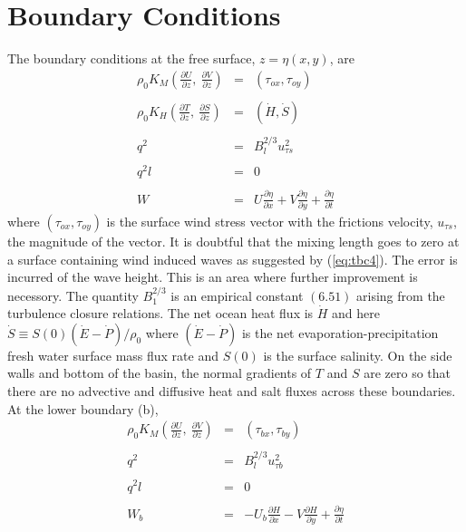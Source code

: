\documentclass[oribibl]{llncs}
\begin{document}
\section{Boundary Conditions}

The boundary conditions at the free surface, $z=\eta(x,y)$, are
\begin{eqnarray}
\rho_0 K_M \left( \frac{\partial U}{\partial z},\  \frac{\partial V}{\partial z} \right) &=& (\tau_{ox}, \tau_{oy})  \label{eq:tbc1}\\ \nonumber \\ 
\rho_0 K_H \left( \frac{\partial T}{\partial z},\  \frac{\partial S}{\partial z} \right) &=& (\dot{H}, \dot{S}) \label{eq:tbc2}\\ \nonumber \\ 
q^2 &=& B_l^{2/3} u_{\tau s}^2 \label{eq:tbc3}\\ \nonumber \\ 
q^2 l &=& 0  \label{eq:tbc4} \\ \nonumber \\ 
W   &=& U \frac{\partial \eta}{\partial x} + V \frac{\partial \eta}{\partial y} + \frac{\partial \eta}{\partial t} \label{eq:tbc5}
\end{eqnarray}
where $(\tau_{ox}, \tau_{oy})$ is the surface wind stress vector with the frictions velocity, $u_{\tau s}$, the magnitude of the vector. It is doubtful that the mixing length goes to zero at a surface containing wind induced waves as suggested by  (\ref{eq:tbc4}). The error is incurred of the wave height. This is an area where further improvement is necessory. The quantity $B_1^{2/3}$ is an empirical constant $(6.51)$ arising from the turbulence closure relations. The net ocean heat flux is $\dot{H}$ and here $\dot{S} \equiv S(0)(\dot{E}-\dot{P})/\rho_0$ where $(\dot{E}-\dot{P})$ is the net evaporation-precipitation fresh water surface mass flux rate and $S(0)$ is the surface salinity. On the side walls and bottom of the basin, the normal gradients of $T$ and $S$ are zero so that there are no advective and diffusive heat and salt fluxes across these boundaries. At the lower boundary (b),
\begin{eqnarray}
\rho_0 K_M \left( \frac{\partial U}{\partial z},\  \frac{\partial V}{\partial z} \right) &=& (\tau_{bx}, \tau_{by})  \label{eq:bbc1}\\ \nonumber \\ 
q^2 &=& B_l^{2/3} u_{\tau b}^2 \label{eq:bbc3}\\ \nonumber \\ 
q^2 l &=& 0  \label{eq:bbc4} \\ \nonumber \\ 
W_b   &=& -U_b \frac{\partial H}{\partial x} - V \frac{\partial H}{\partial y} + \frac{\partial \eta}{\partial t} \label{eq:bbc5}
\end{eqnarray}
\end{document}
